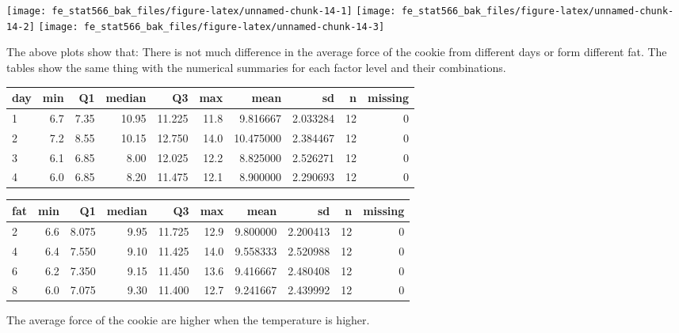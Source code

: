\documentclass[12pt,]{article}
\begin{document}
\texttt{[image: fe\_stat566\_bak\_files/figure-latex/unnamed-chunk-14-1]}
\texttt{[image: fe\_stat566\_bak\_files/figure-latex/unnamed-chunk-14-2]}
\texttt{[image: fe\_stat566\_bak\_files/figure-latex/unnamed-chunk-14-3]}

The above plots show that: There is not much difference in the average
force of the cookie from different days or form different fat. The
tables show the same thing with the numerical summaries for each factor
level and their combinations.

\begin{table}[H]
\centering\begingroup\fontsize{8}{10}\selectfont

\begin{tabular}{lrrrrr>{\columncolor[HTML]{EAFAF1}}rrrr}
\toprule
day & min & Q1 & median & Q3 & max & mean & sd & n & missing\\
\midrule
1 & 6.7 & 7.35 & 10.95 & 11.225 & 11.8 & 9.816667 & 2.033284 & 12 & 0\\
2 & 7.2 & 8.55 & 10.15 & 12.750 & 14.0 & 10.475000 & 2.384467 & 12 & 0\\
3 & 6.1 & 6.85 & 8.00 & 12.025 & 12.2 & 8.825000 & 2.526271 & 12 & 0\\
4 & 6.0 & 6.85 & 8.20 & 11.475 & 12.1 & 8.900000 & 2.290693 & 12 & 0\\
\bottomrule
\end{tabular}
\endgroup{}
\end{table}

\begin{table}[H]
\centering\begingroup\fontsize{8}{10}\selectfont

\begin{tabular}{lrrrrr>{\columncolor[HTML]{EAFAF1}}rrrr}
\toprule
fat & min & Q1 & median & Q3 & max & mean & sd & n & missing\\
\midrule
2 & 6.6 & 8.075 & 9.95 & 11.725 & 12.9 & 9.800000 & 2.200413 & 12 & 0\\
4 & 6.4 & 7.550 & 9.10 & 11.425 & 14.0 & 9.558333 & 2.520988 & 12 & 0\\
6 & 6.2 & 7.350 & 9.15 & 11.450 & 13.6 & 9.416667 & 2.480408 & 12 & 0\\
8 & 6.0 & 7.075 & 9.30 & 11.400 & 12.7 & 9.241667 & 2.439992 & 12 & 0\\
\bottomrule
\end{tabular}
\endgroup{}
\end{table}

The average force of the cookie are higher when the temperature is
higher.
\end{document}
